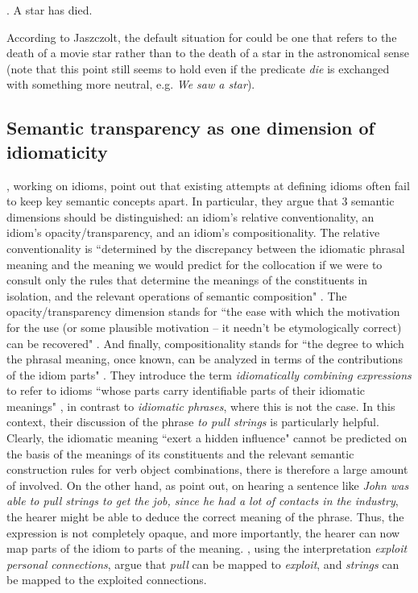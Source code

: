 \ex. A star has died.

According to Jaszczolt, the default situation for \Last could be one that
refers to the death of a movie star rather than to the death of a star
in the astronomical sense (note that this point still seems to hold
even if the predicate \emph{die} is exchanged with something more
neutral, e.g. \emph{We saw a star}).

\subsection{Semantic transparency as one dimension of idiomaticity}
\label{sec:sem-trans-as-one}
\citet{Nunbergetal:1994}, working on idioms, point out that existing attempts
at defining idioms often fail to keep key semantic concepts apart.  In
particular, they argue that 3 semantic dimensions should be distinguished:
an idiom's relative conventionality, an idiom's opacity/transparency, and an
idiom's compositionality. The relative conventionality is ``determined by the
discrepancy between the idiomatic phrasal meaning and the meaning we would
predict for the collocation if we were to consult only the rules that
determine the meanings of the constituents in isolation, and the relevant
operations of semantic composition" \citep[498]{Nunbergetal:1994}. The
opacity/transparency dimension stands for ``the ease with which the motivation for the
use (or some plausible motivation -- it needn't be etymologically correct) can
be recovered" \citep[498]{Nunbergetal:1994}. And finally, compositionality
stands for ``the degree to which the phrasal meaning, once known, can be
analyzed in terms of the contributions of the idiom
parts" \citep[498]{Nunbergetal:1994}.
 They introduce the term
\emph{idiomatically combining expressions} to refer to idioms ``whose parts
carry identifiable parts of their idiomatic
meanings" \citep[496]{Nunbergetal:1994}, in contrast to
\emph{idiomatic phrases}, where this is not the case. In this context, their discussion of
the phrase \emph{to pull strings} is particularly helpful. Clearly, the
idiomatic meaning ``exert a hidden influence" cannot be predicted on the basis
of the meanings of its constituents and the relevant semantic construction
rules for verb object combinations, there is therefore a large amount of
 involved. On the other hand, as
\citet[496]{Nunbergetal:1994} point out,
on hearing a sentence like \emph{John was able to pull strings to get the job,
  since he had a lot of contacts in the industry}, the hearer might be able to
deduce the correct meaning of the phrase. Thus, the expression is not completely opaque, and more importantly, the hearer can now map parts of the idiom
to parts of the meaning. \citeauthor{Nunbergetal:1994}, using the interpretation
\emph{exploit personal connections}, argue that \emph{pull} can be mapped to
\emph{exploit}, and \emph{strings} can be mapped to the exploited connections.


